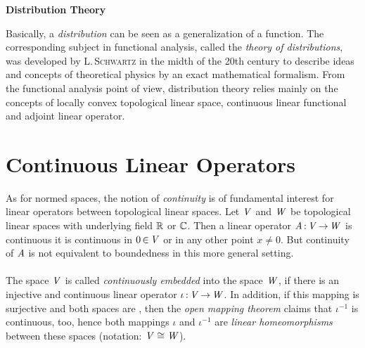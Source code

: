 \documentclass[11pt,twoside]{article}
\begin{document}
\thispagestyle{empty}

\def\Title{Distribution Theory}


\centerline{\large{\textbf{\Title}}}
\vspace{4pt}
\centerline{\small{\textsc{\Author}}}
\vspace{10pt}



\fancyhead[C] {\small{\textsc{\Title}}}
\fancyhead[OL]{\small{\thepage}}
\fancyhead[ER]{\small{\thepage}}

Basically,
a \textit{distribution} can be seen as a generalization of a function.
The corresponding subject in functional analysis,
called the \textit{theory of distributions},
was developed by \textsc{L.\,Schwartz} in the midth of the 20th century
to describe ideas and concepts of theoretical physics
by an exact mathematical formalism.
From the functional analysis point of view,
distribution theory relies mainly on the concepts
of locally convex topological linear space,
continuous linear functional and adjoint linear operator.

\section{Continuous Linear Operators}                                          %
As for normed spaces,
the notion of \textit{continuity} is of fundamental interest
for linear operators between topological linear spaces.
Let $\mathit{V}$ and $\mathit{W}$ be topological linear spaces with underlying field 
${\mathbb{R}}$ or ${\mathbb{C}}$.
Then a  linear operator $\mathit{A} {\,:\,} \mathit{V} {\,\to\,} \mathit{W}$ is continuous
\iff
it is continuous in $0 {\,\in\,} \mathit{V}$ or in any other point $x \neq 0$.
But continuity of $\mathit{A}$ is not equivalent to boundedness
in this more general setting.

\paragraph{} %
The space $\mathit{V}$ is called \textit{continuously embedded} into the space $\mathit{W}$,
if there is an injective and continuous linear operator
$\iota {\,:\,} \mathit{V} {\,\to\,} \mathit{W}$.
In addition,
if this mapping is surjective and both spaces are {\FRECHET},
then the \textit{open mapping theorem} claims that $\iota^{-1}$ is continuous,
too,
hence both mappings $\iota$ and $\iota^{-1}$ are \textit{linear homeomorphisms}
between these spaces (notation: $\mathit{V} \cong \mathit{W}$).
\end{document}
